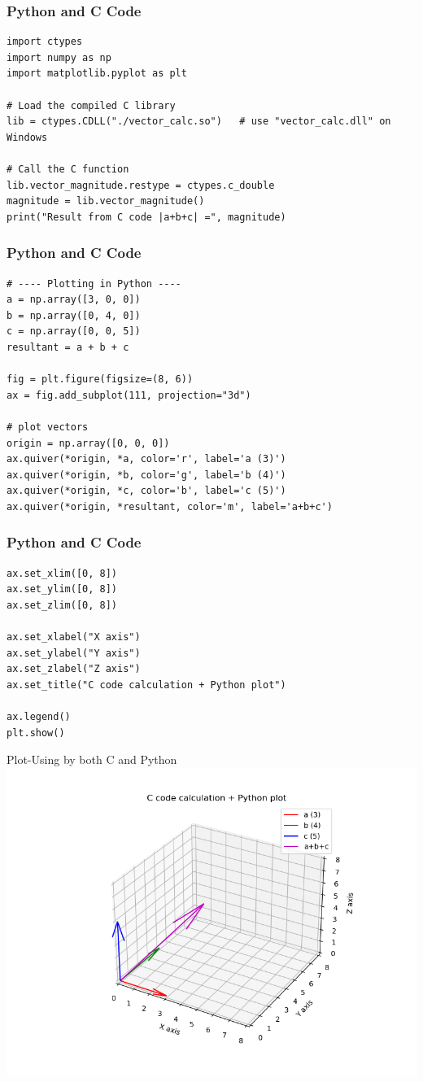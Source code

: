 \documentclass{beamer}
\begin{document}
\begin{frame}[fragile]
\frametitle{Python and C Code}

\begin{lstlisting}
import ctypes
import numpy as np
import matplotlib.pyplot as plt

# Load the compiled C library
lib = ctypes.CDLL("./vector_calc.so")   # use "vector_calc.dll" on Windows

# Call the C function
lib.vector_magnitude.restype = ctypes.c_double
magnitude = lib.vector_magnitude()
print("Result from C code |a+b+c| =", magnitude)
\end{lstlisting}

\end{frame}
\begin{frame}[fragile]
\frametitle{Python and C Code}

\begin{lstlisting}
# ---- Plotting in Python ----
a = np.array([3, 0, 0])
b = np.array([0, 4, 0])
c = np.array([0, 0, 5])
resultant = a + b + c

fig = plt.figure(figsize=(8, 6))
ax = fig.add_subplot(111, projection="3d")

# plot vectors
origin = np.array([0, 0, 0])
ax.quiver(*origin, *a, color='r', label='a (3)')
ax.quiver(*origin, *b, color='g', label='b (4)')
ax.quiver(*origin, *c, color='b', label='c (5)')
ax.quiver(*origin, *resultant, color='m', label='a+b+c')
\end{lstlisting}

\end{frame}
\begin{frame}[fragile]
\frametitle{Python and C Code}

\begin{lstlisting}
ax.set_xlim([0, 8])
ax.set_ylim([0, 8])
ax.set_zlim([0, 8])

ax.set_xlabel("X axis")
ax.set_ylabel("Y axis")
ax.set_zlabel("Z axis")
ax.set_title("C code calculation + Python plot")

ax.legend()
plt.show()
\end{lstlisting}

\end{frame}

\begin{frame}{Plot-Using by both C and Python}
    \centering
    \includegraphics[width=\columnwidth, height=0.8\textheight, keepaspectratio]{figs/fig4.1.png}     
\end{frame}
\end{document}

